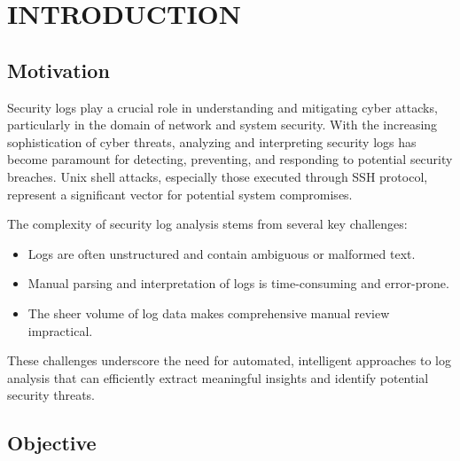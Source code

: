 

\vspace{-1cm}

\section{INTRODUCTION}


    \subsection{Motivation}

        Security logs play a crucial role in understanding and mitigating cyber attacks, particularly in the domain of network and system security. With the increasing sophistication of cyber threats, analyzing and interpreting security logs has become paramount for detecting, preventing, and responding to potential security breaches. Unix shell attacks, especially those executed through SSH protocol, represent a significant vector for potential system compromises.

        \noindent The complexity of security log analysis stems from several key challenges:
        
        \begin{itemize}
            \item Logs are often unstructured and contain ambiguous or malformed text.
            \item Manual parsing and interpretation of logs is time-consuming and error-prone.
            \item The sheer volume of log data makes comprehensive manual review impractical.
        \end{itemize}

        These challenges underscore the need for automated, intelligent approaches to log analysis that can efficiently extract meaningful insights and identify potential security threats.

    \subsection{Objective}

